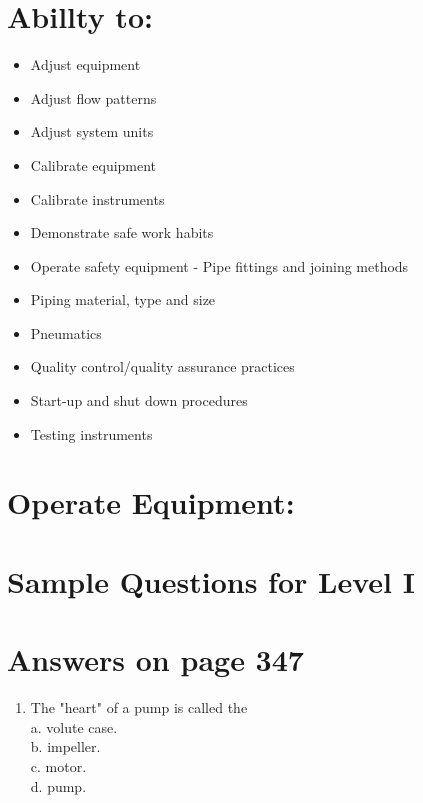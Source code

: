 \documentclass[10pt]{article}
\begin{document}
\section{Abillty to:}
\begin{itemize}
  \item Adjust equipment

  \item Adjust flow patterns

  \item Adjust system units

  \item Calibrate equipment

  \item Calibrate instruments

  \item Demonstrate safe work habits

  \item Operate safety equipment - Pipe fittings and joining methods

  \item Piping material, type and size

  \item Pneumatics

  \item Quality control/quality assurance practices

  \item Start-up and shut down procedures

  \item Testing instruments

\end{itemize}

\section{Operate Equipment:}
\section{Sample Questions for Level I}
\section{Answers on page 347}
\begin{enumerate}
  \item The "heart" of a pump is called the\\
a. volute case.\\
b. impeller.\\
c. motor.\\
d. pump.
\end{enumerate}
\end{document}
